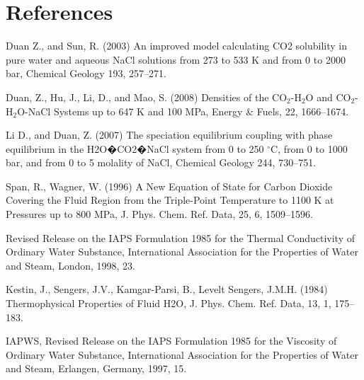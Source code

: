 \documentclass[12pt]{article}
\begin{document}
\section{References}
\begin{description}
\item Duan Z., and Sun, R. (2003) An improved model calculating CO2 solubility in pure water and aqueous NaCl solutions from 273 to 533 K and from 0 to 2000 bar, Chemical Geology 193, 257--271.

\item Duan, Z., Hu, J., Li, D., and Mao, S. (2008) Densities of the CO$_2$-H$_2$O and CO$_2$-H$_2$O-NaCl Systems up to 647 K and 100 MPa, Energy \& Fuels, 22, 1666--1674.

\item Li D., and Duan, Z. (2007) The speciation equilibrium coupling with phase equilibrium in the H2O�CO2�NaCl system from 0 to 250 $^\circ$C, from 0 to 1000 bar, and from 0 to 5 molality of NaCl, Chemical Geology 244, 730--751.

\item Span, R., Wagner, W. (1996) A New Equation of State for Carbon Dioxide Covering the Fluid Region from the Triple-Point Temperature to 1100 K at Pressures up to 800 MPa, J. Phys. Chem. Ref. Data, 25, 6, 1509--1596.

\item Revised Release on the IAPS Formulation 1985 for the Thermal Conductivity of Ordinary Water Substance, International Association for the Properties of Water and Steam, London, 1998, 23. 


\item Kestin, J., Sengers, J.V., Kamgar-Parsi, B., Levelt Sengers, J.M.H. (1984) Thermophysical Properties of Fluid H2O, J. Phys. Chem. Ref. Data, 13, 1, 175--183.


\item IAPWS, Revised Release on the IAPS Formulation 1985 for the Viscosity of Ordinary Water Substance, International Association for the Properties of Water and Steam, Erlangen, Germany, 1997, 15.
\end{description}

%
%
\end{document}
